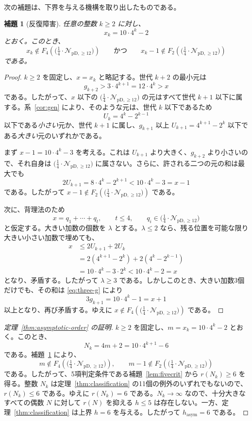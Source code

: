 \documentclass[12pt]{ltjsarticle}
\theoremstyle{plain}
\newtheorem{lemma}[theorem]{補題}
\theoremstyle{definition}
\theoremstyle{plain}
\newcommand{\Pset}{%
  \bigl(\tfrac{1}{4}\cdot\mathcal{N}_{\mathrm{pD},\geq 12}\bigr)%
}
\begin{document}
次の補題は、下界を与える機構を取り出したものである。

\begin{lemma}[反復障害]\label{lem:obstruction}
任意の整数 $k\geq2$ に対し、
\[
  x_k=10\cdot4^k-2
\]
とおく。このとき、
\begin{equation}\label{eq:obstruction}
  x_k\notin F_4(\Pset)
  \qquad\text{かつ}\qquad
  x_k-1\notin F_2(\Pset)
\end{equation}
である。
\end{lemma}

\begin{proof}
$k\geq2$ を固定し、$x=x_k$ と略記する。世代 $k+2$ の最小元は
\[
  g_{k+2}>3\cdot4^{k+1}=12\cdot4^k>x
\]
である。したがって、$x$ 以下の $\Pset$ の元はすべて世代 $k+1$ 以下に属する。系~\ref{cor:gen} により、そのような元は、世代 $k$ 以下であるため
\[
  U_k=4^k-2^{k-1}
\]
以下である\emph{小さい}元か、世代 $k+1$ に属し、$g_{k+1}$ 以上 $U_{k+1}=4^{k+1}-2^k$ 以下である\emph{大きい}元のいずれかである。

まず $x-1=10\cdot4^k-3$ を考える。これは $U_{k+1}$ より大きく、$g_{k+2}$ より小さいので、それ自身は $\Pset$ に属さない。さらに、許される二つの元の和は最大でも
\[
  2U_{k+1}=8\cdot4^k-2^{k+1}<10\cdot4^k-3=x-1
\]
である。したがって $x-1\notin F_2(\Pset)$ である。

次に、背理法のため
\[
  x=q_1+\cdots+q_t,\qquad t\leq4,\qquad q_i\in\Pset
\]
と仮定する。大きい加数の個数を $\lambda$ とする。$\lambda\leq2$ なら、残る位置を可能な限り大きい小さい加数で埋めても、
\begin{align*}
  x
  &\leq2U_{k+1}+2U_k\\
  &=2(4^{k+1}-2^k)+2(4^k-2^{k-1})\\
  &=10\cdot4^k-3\cdot2^k
  <10\cdot4^k-2=x
\end{align*}
となり、矛盾する。したがって $\lambda\geq3$ である。しかしこのとき、大きい加数3個だけでも、その和は \eqref{eq:three-g} により
\[
  3g_{k+1}=10\cdot4^k-1=x+1
\]
以上となり、再び矛盾する。ゆえに $x\notin F_4(\Pset)$ である。
\end{proof}

\begin{proof}[定理~\ref{thm:asymptotic-order} の証明]
$k\geq2$ を固定し、$m=x_k=10\cdot4^k-2$ とおく。このとき、
\[
  N_k=4m+2=10\cdot4^{k+1}-6
\]
である。補題~\ref{lem:obstruction} により、
\[
  m\notin F_4(\Pset),\qquad m-1\notin F_2(\Pset)
\]
である。したがって、5項判定条件である補題~\ref{lem:fivecrit} から $r(N_k)\geq6$ を得る。整数 $N_k$ は定理~\ref{thm:classification} の11個の例外のいずれでもないので、$r(N_k)\leq6$ である。ゆえに $r(N_k)=6$ である。$N_k\to\infty$ なので、十分大きなすべての偶数 $N$ に対して $r(N)$ を抑える $h\leq5$ は存在しない。一方、定理~\ref{thm:classification} は上界 $h=6$ を与える。したがって $h_{\mathrm{asym}}=6$ である。
\end{proof}
\end{document}
